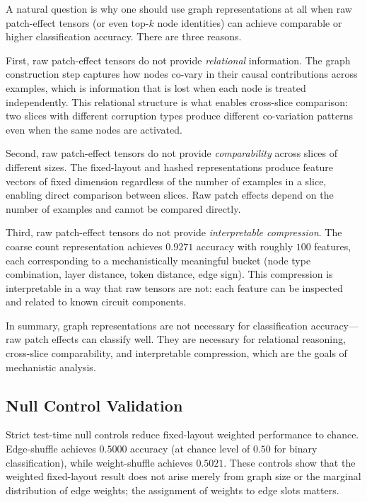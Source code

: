 \documentclass[11pt,a4paper]{article}
\begin{document}
A natural question is why one should use graph representations at all when raw patch-effect tensors (or even top-$k$ node identities) can achieve comparable or higher classification accuracy. There are three reasons.

First, raw patch-effect tensors do not provide \emph{relational} information. The graph construction step captures how nodes co-vary in their causal contributions across examples, which is information that is lost when each node is treated independently. This relational structure is what enables cross-slice comparison: two slices with different corruption types produce different co-variation patterns even when the same nodes are activated.

Second, raw patch-effect tensors do not provide \emph{comparability} across slices of different sizes. The fixed-layout and hashed representations produce feature vectors of fixed dimension regardless of the number of examples in a slice, enabling direct comparison between slices. Raw patch effects depend on the number of examples and cannot be compared directly.

Third, raw patch-effect tensors do not provide \emph{interpretable compression}. The coarse count representation achieves $0.9271$ accuracy with roughly $100$ features, each corresponding to a mechanistically meaningful bucket (node type combination, layer distance, token distance, edge sign). This compression is interpretable in a way that raw tensors are not: each feature can be inspected and related to known circuit components.

In summary, graph representations are not necessary for classification accuracy---raw patch effects can classify well. They are necessary for relational reasoning, cross-slice comparability, and interpretable compression, which are the goals of mechanistic analysis.

\subsection{Null Control Validation}

Strict test-time null controls reduce fixed-layout weighted performance to chance. Edge-shuffle achieves $0.5000$ accuracy (at chance level of $0.50$ for binary classification), while weight-shuffle achieves $0.5021$. These controls show that the weighted fixed-layout result does not arise merely from graph size or the marginal distribution of edge weights; the assignment of weights to edge slots matters.
\end{document}
